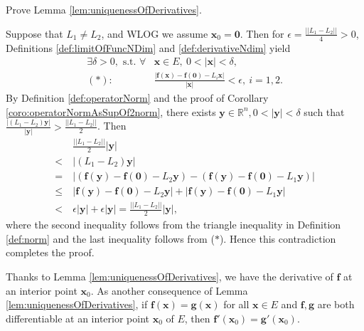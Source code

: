 \begin{exc}
  Prove Lemma \ref{lem:uniquenessOfDerivatives}.
\end{exc}

\begin{solution}
  Suppose that $L_{1}\neq L_{2}$,
  and WLOG we assume $\mathbf{x}_{0}=\mathbf{0}$.
  Then for
  $\epsilon=\frac{||L_{1}-L_{2}||}{4}>0$, Definitions
  \ref{def:limitOfFuncNDim} and
  \ref{def:derivativeNdim} yield
  \begin{align*}
    \exists \delta>0,\text{ s.t. }
    \forall &\mathbf{x}\in E,\ 0<|\mathbf{x}|<\delta, \\
    (*):\quad
            &\frac{|\mathbf{f}(\mathbf{x})-\mathbf{f}(\mathbf{0})
              -L_{i}\mathbf{x}|}{|\mathbf{x}|}<\epsilon,\
    i=1,2.
  \end{align*}
  By Definition \ref{def:operatorNorm} and the proof of
  Corollary \ref{coro:operatorNormAsSupOf2norm}, there exists
  $\mathbf{y}\in \mathbb{R}^{n}, 0<|\mathbf{y}|<\delta$ such that
  $\frac{|(L_{1}-L_{2})\mathbf{y}|}{|\mathbf{y}|}
  >\frac{||L_{1}-L_{2}||}{2}$. Then
  \begin{align*}
    &\ \frac{||L_{1}-L_{2}||}{2}|\mathbf{y}|\\
    < &\ |(L_{1}-L_{2})\mathbf{y}| \\
    = &\ |(\mathbf{f}(\mathbf{y})-\mathbf{f}(\mathbf{0})-L_{2}\mathbf{y})
        -(\mathbf{f}(\mathbf{y})-\mathbf{f}(\mathbf{0})-L_{1}\mathbf{y})|\\
    \le &\ |\mathbf{f}(\mathbf{y})-\mathbf{f}(\mathbf{0})-L_{2}\mathbf{y}|
          +|\mathbf{f}(\mathbf{y})-\mathbf{f}(\mathbf{0})-L_{1}\mathbf{y}| \\
    < &\ \epsilon |\mathbf{y}|+\epsilon |\mathbf{y}|
    =\frac{||L_{1}-L_{2}||}{2}|\mathbf{y}|,
  \end{align*}
  where the second inequality follows from the triangle inequality
  in Definition \ref{def:norm} and
  the last inequality follows from ($*$).
  Hence this contradiction completes the proof.
\end{solution}

\begin{rem}
  Thanks to Lemma \ref{lem:uniquenessOfDerivatives},
  we have the derivative of $\mathbf{f}$ at an interior point
  $\mathbf{x}_0$.
  As another consequence of Lemma \ref{lem:uniquenessOfDerivatives},
  if $\mathbf{f}(\mathbf{x})=\mathbf{g}(\mathbf{x})$
  for all $\mathbf{x}\in E$ and $\mathbf{f},\mathbf{g}$
  are both differentiable at an interior point $\mathbf{x}_0$ of $E$,
  then $\mathbf{f}'(\mathbf{x}_0)=\mathbf{g}'(\mathbf{x}_0)$.
\end{rem}

